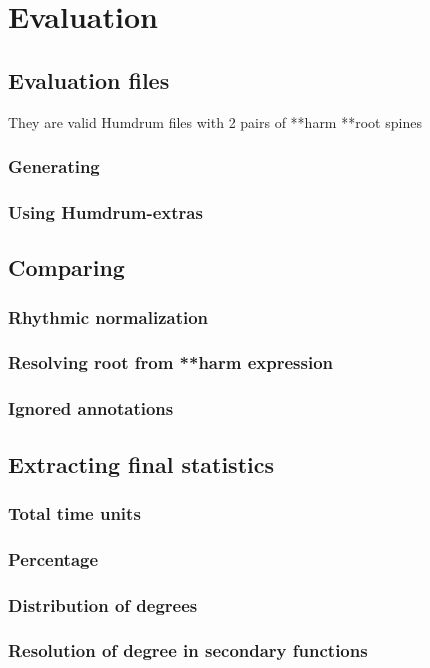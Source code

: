 \section{Evaluation}
  \subsection{Evaluation files}
		They are valid Humdrum files with 2 pairs of **harm **root spines
    \subsubsection{Generating}
		\subsubsection{Using Humdrum-extras}
	\subsection{Comparing}
		\subsubsection{Rhythmic normalization}
		\subsubsection{Resolving root from **harm expression}
		\subsubsection{Ignored annotations}
	\subsection{Extracting final statistics}
		\subsubsection{Total time units}
		\subsubsection{Percentage}
		\subsubsection{Distribution of degrees}
		\subsubsection{Resolution of degree in secondary functions}
